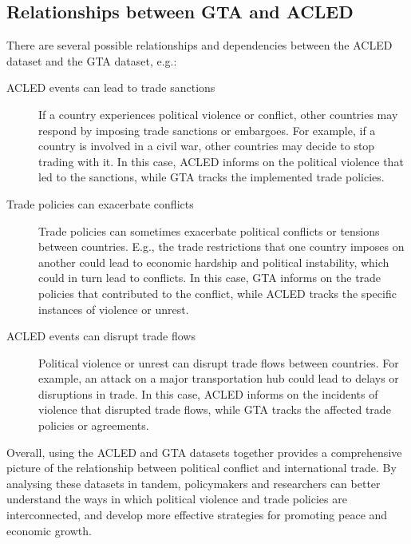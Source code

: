 \subsection{Relationships between GTA and ACLED}
There are several possible relationships and dependencies between the ACLED dataset and the GTA dataset, e.g.:
\begin{description}
    \item[ACLED events can lead to trade sanctions] If a country experiences political violence or conflict, other countries may respond by imposing trade sanctions or embargoes. For example, if a country is involved in a civil war, other countries may decide to stop trading with it. %
    In this case, ACLED informs on the political violence that led to the sanctions, while GTA tracks the implemented trade policies.
    \item[Trade policies can exacerbate conflicts] Trade policies can sometimes exacerbate political conflicts or tensions between countries. E.g., the trade restrictions that one country imposes on another could lead to economic hardship and political instability, which could in turn lead to conflicts. In this case, GTA informs on the trade policies that contributed to the conflict, while ACLED tracks the specific instances of violence or unrest.
    \item[ACLED events can disrupt trade flows] Political violence or unrest can disrupt trade flows between countries. For example, an attack on a major transportation hub could lead to delays or disruptions in trade. In this case, ACLED informs on the incidents of violence that disrupted trade flows, while GTA tracks the affected trade policies or agreements.
\end{description}

Overall, using the ACLED and GTA datasets together provides a comprehensive picture of the relationship between political conflict and international trade.
By analysing these datasets in tandem, policymakers and researchers can better understand the ways in which political violence and trade policies are interconnected, and develop more effective strategies for promoting peace and economic growth.
